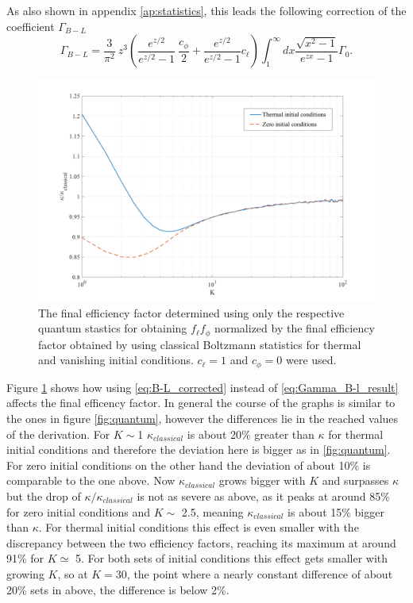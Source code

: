 As also shown in appendix \ref{ap:statistics}, this leads the following correction of the coefficient $\Gamma_{B-L}$
\begin{equation}
\Gamma_{B-L}=\frac{3}{\pi^2}\:z^3\left(\frac{e^{z/2}}{e^{z/2}-1}\:\frac{c_\phi}{2}+\frac{e^{z/2}}{e^{z/2}-1}c_\ell\right)\int_{1}^{\infty}dx\frac{\sqrt{x^2-1}}{e^{zx}-1}\Gamma_0.
\label{eq:B-L_corrected}
\end{equation}
\begin{figure}[H]
	\centering
	\includegraphics[width=\linewidth]{Images/quantum1}
	\caption{The final efficiency factor determined using only the respective quantum stastics for obtaining $f_\ell f_\phi$ normalized by the final efficiency factor obtained by using classical Boltzmann statistics for thermal and vanishing initial conditions. $c_\ell=1$ and $c_\phi=0$ were used.}
	\label{fig:quantum1}
\end{figure} \noindent
Figure \ref{fig:quantum1} shows how using \eqref{eq:B-L_corrected} instead of \eqref{eq:Gamma_B-l_result} affects the final efficency factor. In general the course of the graphs is similar to the ones in figure \ref{fig:quantum}, however the differences lie in the reached values of the derivation. For $K\sim$1 $\kappa_{classical}$ is about 20\% greater than $\kappa$ for thermal initial conditions and therefore the deviation here is bigger as in \ref{fig:quantum}. For zero initial conditions on the other hand the deviation of about 10\% is comparable to the one above. Now $\kappa_{classical}$ grows bigger with $K$ and surpasses $\kappa$ but the drop of $\kappa/\kappa_{classical}$ is not as severe as above, as it peaks at around 85\% for zero initial conditions and $K\sim$ 2.5, meaning $\kappa_{classical}$ is about 15\% bigger than $\kappa$. For thermal initial conditions this effect is even smaller with the discrepancy between the two efficiency factors, reaching its maximum at around 91\% for $K\simeq$ 5. For both sets of initial conditions this effect gets smaller with growing $K$, so at $K=30$, the point where a nearly constant difference of about 20\% sets in above, the difference is below 2\%. \newline \indent
